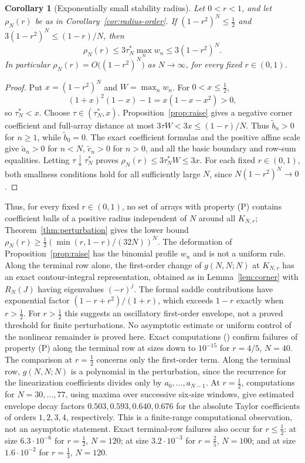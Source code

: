 \documentclass[twoside,10pt]{article}
\numberwithin{equation}{section}
\theoremstyle{slbody}
\newtheorem{corollary}[theorem]{Corollary}
\theoremstyle{definition}
\theoremstyle{remark}
\begin{document}
\begin{corollary}[Exponentially small stability radius]\label{cor:radius-exp}
Let $0<r<1$, and let $\rho_N(r)$ be as in Corollary~\ref{cor:radius-order}. If $(1-r^2)^N\leq\tfrac12$ and $3(1-r^2)^N\leq(1-r)/N$, then
\[
\rho_N(r)\leq3\tau_N^*\max_nw_n\leq3(1-r^2)^N.
\]
In particular $\rho_N(r)=O\bigl((1-r^2)^N\bigr)$ as $N\to\infty$, for every fixed $r\in(0,1)$.
\end{corollary}
\begin{proof}
Put $x=(1-r^2)^N$ and $W=\max_nw_n$. For $0<x\leq\tfrac12$,
\[
(1+x)^2(1-x)-1=x(1-x-x^2)>0,
\]
so $\tau_N^*<x$. Choose $\tau\in(\tau_N^*,x)$. Proposition~\ref{prop:raise} gives a negative corner coefficient and full-array distance at most $3\tau W<3x\leq(1-r)/N$. Thus $\widetilde b_n>0$ for $n\geq1$, while $\widetilde b_0=0$. The exact coefficient formulas and the positive affine scale give $\widetilde a_n>0$ for $n<N$, $\widetilde c_n>0$ for $n>0$, and all the basic boundary and row-sum equalities. Letting $\tau\downarrow\tau_N^*$ proves $\rho_N(r)\leq3\tau_N^*W\leq3x$. For each fixed $r\in(0,1)$, both smallness conditions hold for all sufficiently large $N$, since $N(1-r^2)^N\to0$.
\end{proof}

Thus, for every fixed $r\in(0,1)$, no set of arrays with property (P) contains coefficient balls of a positive radius independent of $N$ around all $K_{N,r}$; Theorem~\ref{thm:perturbation} gives the lower bound $\rho_N(r)\geq\tfrac12(\min(r,1-r)/(32N))^N$. The deformation of Proposition~\ref{prop:raise} has the binomial profile $w_n$ and is not a uniform rule. Along the terminal row alone, the first-order change of $g(N,N;N)$ at $K_{N,r}$ has an exact contour-integral representation, obtained as in Lemma~\ref{lem:corner} with $R_N(J)$ having eigenvalues $(-r)^j$. The formal saddle contributions have exponential factor $(1-r+r^2)/(1+r)$, which exceeds $1-r$ exactly when $r>\tfrac12$. For $r>\tfrac12$ this suggests an oscillatory first-order envelope, not a proved threshold for finite perturbations. No asymptotic estimate or uniform control of the nonlinear remainder is proved here. Exact computations () confirm failures of property (P) along the terminal row at sizes down to $10^{-15}$ for $r=4/5$, $N=40$. The comparison at $r=\tfrac12$ concerns only the first-order term. Along the terminal row, $g(N,N;N)$ is a polynomial in the perturbation, since the recurrence for the linearization coefficients divides only by $a_0,\ldots,a_{N-1}$. At $r=\tfrac12$, computations for $N=30,\ldots,77$, using maxima over successive six-size windows, give estimated envelope decay factors $0.503,0.593,0.640,0.676$ for the absolute Taylor coefficients of orders $1,2,3,4$, respectively. This is a finite-range computational observation, not an asymptotic statement. Exact terminal-row failures also occur for $r\leq\tfrac12$: at size $6.3\cdot10^{-6}$ for $r=\tfrac12$, $N=120$; at size $3.2\cdot10^{-3}$ for $r=\tfrac25$, $N=100$; and at size $1.6\cdot10^{-2}$ for $r=\tfrac13$, $N=120$.
\end{document}
